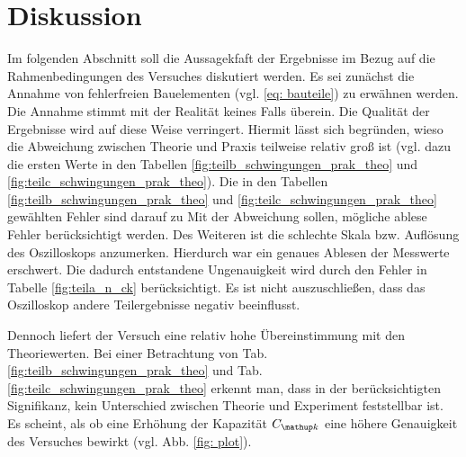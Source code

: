 \section{Diskussion}
Im folgenden Abschnitt soll die Aussagekfaft der Ergebnisse im Bezug auf
die Rahmenbedingungen des Versuches diskutiert werden.
Es sei zunächst die Annahme von fehlerfreien Bauelementen (vgl. \eqref{eq: bauteile})
zu erwähnen werden. Die Annahme stimmt mit der Realität keines Falls überein. %
Die Qualität der Ergebnisse wird auf diese Weise verringert.
Hiermit lässt sich begründen, wieso die Abweichung zwischen Theorie und Praxis teilweise
relativ groß ist (vgl. dazu die ersten Werte in den Tabellen \ref{fig:teilb_schwingungen_prak_theo} und \ref{fig:teilc_schwingungen_prak_theo}).
Die in den Tabellen \ref{fig:teilb_schwingungen_prak_theo} und \ref{fig:teilc_schwingungen_prak_theo} gewählten Fehler sind darauf zu
Mit der Abweichung sollen, mögliche ablese Fehler berücksichtigt werden. %
Des Weiteren ist die schlechte Skala bzw. Auflösung des Oszilloskops anzumerken.
Hierdurch war ein genaues Ablesen der Messwerte erschwert.
Die dadurch entstandene Ungenauigkeit wird durch den Fehler in Tabelle \ref{fig:teila_n_ck} berücksichtigt.
Es ist nicht auszuschließen, dass das Oszilloskop andere Teilergebnisse negativ beeinflusst.

Dennoch liefert der Versuch eine relativ hohe Übereinstimmung mit den Theoriewerten.
Bei einer Betrachtung von Tab. \ref{fig:teilb_schwingungen_prak_theo} und Tab. \ref{fig:teilc_schwingungen_prak_theo} erkennt man,  %
dass in der berücksichtigten Signifikanz, kein Unterschied zwischen
Theorie und Experiment feststellbar ist.
Es scheint, als ob eine Erhöhung der Kapazität $C\ua{k}$ eine höhere Genauigkeit des Versuches bewirkt (vgl. Abb. \ref{fig: plot}).
